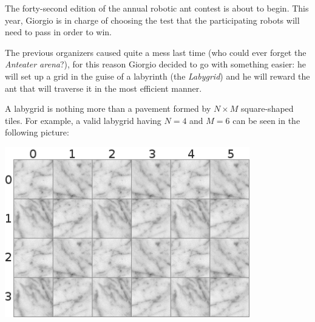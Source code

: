 \usepackage{xcolor}
\usepackage{afterpage}
\usepackage{pifont,mdframed}
\usepackage[bottom]{footmisc}

\makeatletter
\gdef\this@inputfilename{input.txt}
\gdef\this@outputfilename{output.txt}
\makeatother

\newcommand{\inputfile}{\texttt{input.txt}}
\newcommand{\outputfile}{\texttt{output.txt}}

\newenvironment{warning}
  {\par\begin{mdframed}[linewidth=2pt,linecolor=gray]%
    \begin{list}{}{\leftmargin=1cm
                   \labelwidth=\leftmargin}\item[\Large\ding{43}]}
  {\end{list}\end{mdframed}\par}

The forty-second edition of the annual robotic ant contest is about to begin. This year, Giorgio is in charge of choosing the test that the participating robots will need to pass in order to win.

The previous organizers caused quite a mess last time (who could ever forget the \emph{Anteater arena}?), for this reason Giorgio decided to go with something easier: he will set up a grid in the guise of a labyrinth (the \emph{Labygrid}) and he will reward the ant that will traverse it in the most efficient manner.

A labygrid is nothing more than a pavement formed by $N \times M$ square-shaped tiles. For example, a valid labygrid having $N=4$ and $M=6$ can be seen in the following picture:

\begin{center}
  \includegraphics[width=0.8\textwidth]{floor.png}
\end{center}

